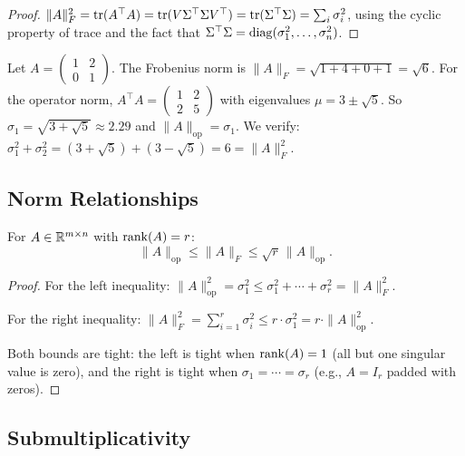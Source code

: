 \documentclass[11pt,a4paper]{article}
\begin{document}
\begin{proof}
$\|A\|_F^2 = \operatorname{tr}(A^\top A) = \operatorname{tr}(V\Sigma^\top\Sigma V^\top)
= \operatorname{tr}(\Sigma^\top\Sigma) = \sum_i \sigma_i^2$,
using the cyclic property of trace and the fact that
$\Sigma^\top \Sigma = \operatorname{diag}(\sigma_1^2, \ldots, \sigma_n^2)$.
\end{proof}

\begin{example}
\label{ex:norms_computation}
Let $A = \begin{pmatrix} 1 & 2 \\ 0 & 1 \end{pmatrix}$.
The Frobenius norm is $\|A\|_F = \sqrt{1 + 4 + 0 + 1} = \sqrt{6}$.
For the operator norm, $A^\top A = \begin{pmatrix} 1 & 2 \\ 2 & 5 \end{pmatrix}$
with eigenvalues $\mu = 3 \pm \sqrt{5}$.  So
$\sigma_1 = \sqrt{3 + \sqrt{5}} \approx 2.29$ and
$\|A\|_{\mathrm{op}} = \sigma_1$.  We verify:
$\sigma_1^2 + \sigma_2^2 = (3 + \sqrt{5}) + (3 - \sqrt{5}) = 6 = \|A\|_F^2$.
\end{example}

\subsection{Norm Relationships}

\begin{theorem}
\label{thm:norm_ineq}
For $A \in \mathbb{R}^{m \times n}$ with $\operatorname{rank}(A) = r$:
\[
  \|A\|_{\mathrm{op}} \leq \|A\|_F \leq \sqrt{r}\,\|A\|_{\mathrm{op}}.
\]
\end{theorem}

\begin{proof}
For the left inequality:
$\|A\|_{\mathrm{op}}^2 = \sigma_1^2 \leq \sigma_1^2 + \cdots + \sigma_r^2
= \|A\|_F^2$.

For the right inequality:
$\|A\|_F^2 = \sum_{i=1}^r \sigma_i^2 \leq r \cdot \sigma_1^2
= r \cdot \|A\|_{\mathrm{op}}^2$.

Both bounds are tight: the left is tight when $\operatorname{rank}(A) = 1$
(all but one singular value is zero), and the right is tight when
$\sigma_1 = \cdots = \sigma_r$ (e.g., $A = I_r$ padded with zeros).
\end{proof}

\subsection{Submultiplicativity}
\end{document}

